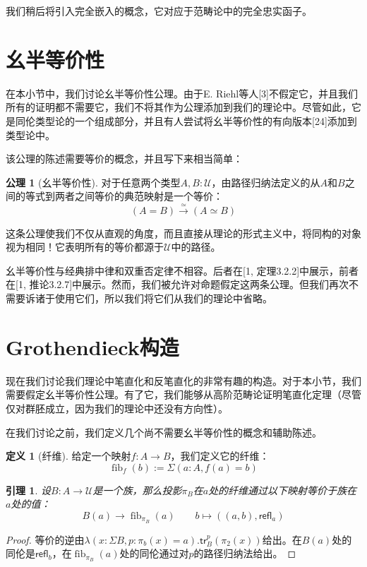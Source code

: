 \documentclass{ctexrep}
\theoremstyle{plain}
\newtheorem{lemma}[theorem]{引理}
\theoremstyle{definition}
\newtheorem{definition}[theorem]{定义}
\theoremstyle{remark}
\theoremstyle{definition}
\newtheorem{axiom}[theorem]{公理}
\theoremstyle{definition}
\theoremstyle{definition}
\newcommand{\coloneqq}{\mathrel{:=}}
\newcommand{\fib}{\operatorname{fib}}
\newcommand{\tr}{\mathsf{tr}}
\newcommand{\refl}{\mathsf{refl}}
\newcommand{\UU}{\mathcal{U}}
\begin{document}
我们稍后将引入完全嵌入的概念，它对应于范畴论中的完全忠实函子。

\section{幺半等价性}

在本小节中，我们讨论幺半等价性公理。由于E. Riehl等人[3]不假定它，并且我们所有的证明都不需要它，我们不将其作为公理添加到我们的理论中。尽管如此，它是同伦类型论的一个组成部分，并且有人尝试将幺半等价性的有向版本[24]添加到类型论中。

该公理的陈述需要等价的概念，并且写下来相当简单：

\begin{axiom}[幺半等价性]
对于任意两个类型$A,B:\UU$，由路径归纳法定义的从$A$和$B$之间的等式到两者之间等价的典范映射是一个等价：
\[
(A = B) \xrightarrow{\simeq} (A \simeq B)
\]
\end{axiom}

这条公理使我们不仅从直观的角度，而且直接从理论的形式主义中，将同构的对象视为相同！它表明所有的等价都源于$\UU$中的路径。

幺半等价性与经典排中律和双重否定律不相容。后者在[1, 定理3.2.2]中展示，前者在[1, 推论3.2.7]中展示。然而，我们被允许对命题假定这两条公理。但我们再次不需要诉诸于使用它们，所以我们将它们从我们的理论中省略。

\section{Grothendieck构造}

现在我们讨论我们理论中笔直化和反笔直化的非常有趣的构造。对于本小节，我们需要假定幺半等价性公理。有了它，我们能够从高阶范畴论证明笔直化定理（尽管仅对群胚成立，因为我们的理论中还没有方向性）。

在我们讨论之前，我们定义几个尚不需要幺半等价性的概念和辅助陈述。

\begin{definition}[纤维]
给定一个映射$f:A\to B$，我们定义它的纤维：
\[
\fib_f(b)\coloneqq \Sigma(a:A,f(a)=b)
\]
\end{definition}

\begin{lemma}
设$B:A\to\UU$是一个族，那么投影$\pi_B$在$a$处的纤维通过以下映射等价于族在$a$处的值：
\[
B(a) \to \fib_{\pi_B}(a)\qquad b\mapsto ((a,b),\refl_a)
\]
\end{lemma}

\begin{proof}
等价的逆由$\lambda(x:\Sigma B,p:\pi_b(x)=a).\tr_B^p(\pi_2(x))$给出。在$B(a)$处的同伦是$\refl_b$，在$\fib_{\pi_B}(a)$处的同伦通过对$p$的路径归纳法给出。
\end{proof}
\end{document}
